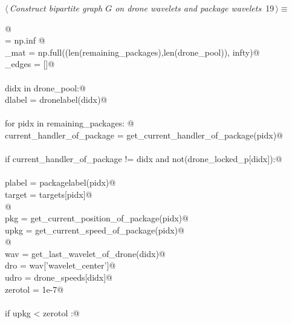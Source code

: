 \documentclass[10pt, english, oneside]{report}
\begin{document}
\begin{flushleft} \small
\begin{minipage}{\linewidth}\label{scrap16}\raggedright\small
{} $\langle\,${\itshape Construct bipartite graph $G$ on drone wavelets and package wavelets}\nobreak\ {\footnotesize {19}}$\,\rangle\equiv$
\vspace{-1ex}
\begin{list}{}{} \item
\mbox{}\verb@  @\\
\mbox{}\verb@infty       = np.inf @\\
\mbox{}\verb@G_mat       = np.full((len(remaining_packages),len(drone_pool)), infty)@\\
\mbox{}\verb@lbend_edges = []@\\
\mbox{}\verb@@\\
\mbox{}\verb@for didx in drone_pool:@\\
\mbox{}\verb@    dlabel = dronelabel(didx)@\\
\mbox{}\verb@@\\
\mbox{}\verb@    for pidx in remaining_packages: @\\
\mbox{}\verb@        current_handler_of_package = get_current_handler_of_package(pidx)@\\
\mbox{}\verb@@\\
\mbox{}\verb@        if current_handler_of_package != didx and not(drone_locked_p[didx]):@\\
\mbox{}\verb@@\\
\mbox{}\verb@                plabel = packagelabel(pidx)@\\
\mbox{}\verb@                target = targets[pidx]@\\
\mbox{}\verb@ @\\
\mbox{}\verb@                pkg  = get_current_position_of_package(pidx)@\\
\mbox{}\verb@                upkg = get_current_speed_of_package(pidx)@\\
\mbox{}\verb@    @\\
\mbox{}\verb@                wav  = get_last_wavelet_of_drone(didx)@\\
\mbox{}\verb@                dro  = wav['wavelet_center']@\\
\mbox{}\verb@                udro = drone_speeds[didx]@\\
\mbox{}\verb@                zerotol = 1e-7@\\
\mbox{}\verb@@\\
\mbox{}\verb@                if upkg < zerotol :@\\

\end{list}
\end{minipage}
\end{flushleft}
\end{document}
